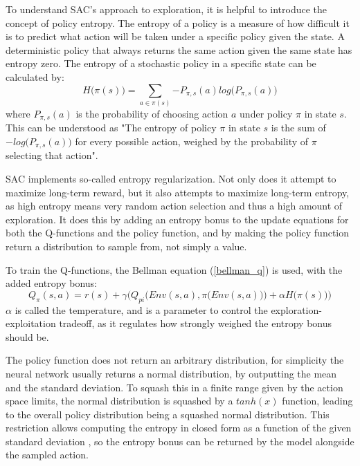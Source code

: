 To understand SAC's approach to exploration, it is helpful to introduce the concept of policy entropy. The entropy of a policy is a measure of how difficult it is to predict what action will be taken under a specific policy given the state. A deterministic policy that always returns the same action given the same state has entropy zero. The entropy of a stochastic policy in a specific state can be calculated by:
\begin{equation}
    H\big(\pi(s)\big) = \sum_{a \in \pi(s)}{-P_{\pi, s}(a) log\big(P_{\pi, s}(a)\big)}
\end{equation} where $P_{\pi, s}(a)$ is the probability of choosing action $a$ under policy $\pi$ in state $s$. This can be understood as "The entropy of policy $\pi$ in state $s$ is the sum of $-log\big(P_{\pi, s}(a)\big)$ for every possible action, weighed by the probability of $\pi$ selecting that action".

SAC implements so-called entropy regularization. Not only does it attempt to maximize long-term reward, but it also attempts to maximize long-term entropy, as high entropy means very random action selection and thus a high amount of exploration. It does this by adding an entropy bonus to the update equations for both the Q-functions and the policy function, and by making the policy function return a distribution to sample from, not simply a value.

To train the Q-functions, the Bellman equation (\ref{bellman_q}) is used, with the added entropy bonus:
\begin{equation}
    Q_{\pi}(s, a) = r(s) + \gamma \bigg(Q_{pi}\Big(Env(s, a), \pi\big(Env(s, a)\big)\Big) + \alpha H\big(\pi(s)\big)\bigg)
\end{equation}
$\alpha$ is called the temperature, and is a parameter to control the exploration-exploitation tradeoff, as it regulates how strongly weighed the entropy bonus should be.

The policy function does not return an arbitrary distribution, for simplicity the neural network usually returns a normal distribution, by outputting the mean and the standard deviation. To squash this in a finite range given by the action space limits, the normal distribution is squashed by a $tanh(x)$ function, leading to the overall policy distribution being a squashed normal distribution. This restriction allows computing the entropy in closed form as a function of the given standard deviation \cite[explained in detail in the code comments of the SpinningUp SAC implementation]{SpinningUp2018}, so the entropy bonus can be returned by the model alongside the sampled action.

